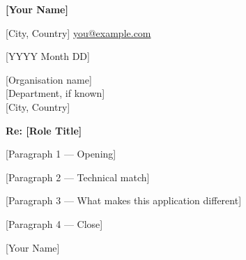 \documentclass[a4paper, 11pt]{article}
\begin{document}
\color{body}

{\large\textbf{[Your Name]}}\par
{\small\color{subtle}
  [City, Country]\quad
  \href{mailto:you@example.com}{you@example.com}\quad
  [phone]
}\par
\vspace{18pt}

{\small [YYYY Month DD]}\par
\vspace{10pt}
{\small [Organisation name]\\{}
[Department, if known]\\{}
[City, Country]}\par
\vspace{18pt}

\textbf{Re: [Role Title]}

\vspace{14pt}

[Paragraph 1 — Opening]

[Paragraph 2 — Technical match]

[Paragraph 3 — What makes this application different]

[Paragraph 4 — Close]

\vspace{20pt}
[Your Name]
\end{document}
